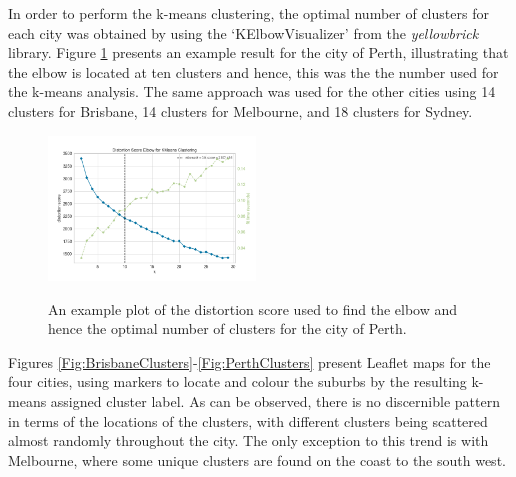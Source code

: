 \documentclass[12pt]{article}
\begin{document}
    \clearpage

    In order to perform the k-means clustering, the optimal number of clusters for each city was obtained by using the `KElbowVisualizer' from the \emph{yellowbrick} library. Figure \ref{Fig:PerthDistortionScoreElbow} presents an example result for the city of Perth, illustrating that the elbow is located at ten clusters and hence, this was the the number used for the k-means analysis. The same approach was used for the other cities using 14 clusters for Brisbane, 14 clusters for Melbourne, and 18 clusters for Sydney.

    \begin{figure}[h!]
        \begin{center}
            \label{Fig:PerthDistortionScoreElbow}\includegraphics[width=0.49\textwidth,keepaspectratio]{Figures/PerthDistortionScoreElbow}
        \end{center}
        \caption{An example plot of the distortion score used to find the elbow and hence the optimal number of clusters for the city of Perth.}
    \end{figure}

    Figures \ref{Fig:BrisbaneClusters}-\ref{Fig:PerthClusters} present Leaflet maps for the four cities, using markers to locate and colour the suburbs by the resulting k-means assigned cluster label. As can be observed, there is no discernible pattern in terms of the locations of the clusters, with different clusters being scattered almost randomly throughout the city. The only exception to this trend is with Melbourne, where some unique clusters are found on the coast to the south west.
\end{document}
